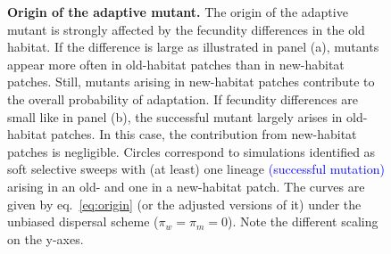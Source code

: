 \documentclass[11pt]{article}
\newcommand{\francois}[1]{\textcolor{blue}{(#1)}}
\begin{document}
\begin{figure}[t!]
	\caption{\textbf{Origin of the adaptive mutant.} \small The origin of the adaptive mutant is strongly affected by the fecundity differences in the old habitat. If the difference is large as illustrated in panel (a), mutants appear more often in old-habitat patches than in new-habitat patches. Still, mutants arising in new-habitat patches contribute to the overall probability of adaptation. If fecundity differences are small like in panel (b), the successful mutant largely arises in old-habitat patches. In this case, the contribution from new-habitat patches is negligible. Circles correspond to simulations identified as soft selective sweeps with (at least) one lineage \francois{successful mutation} arising in an old- and one in a new-habitat patch. The curves are given by eq.~\eqref{eq:origin} (or the adjusted versions of it) under the unbiased dispersal scheme ($\pi_w=\pi_m=0$). Note the different scaling on the y-axes.}
	\label{fig:origin}
\end{figure}

\end{document}
